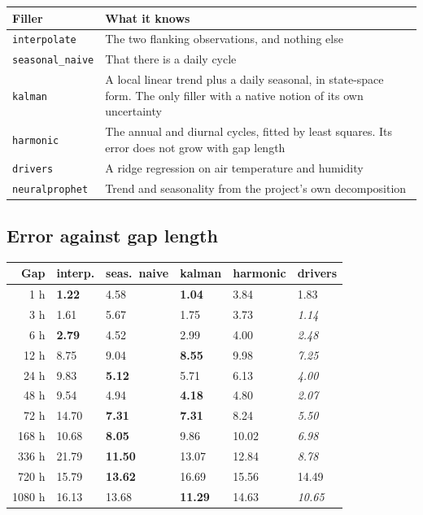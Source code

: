\documentclass[11pt,a4paper]{article}
\begin{document}
\begin{center}
\small
\begin{tabularx}{\textwidth}{L{3.0cm}Y}
\toprule
\textbf{Filler} & \textbf{What it knows} \\
\midrule
\texttt{interpolate}    & The two flanking observations, and nothing else \\
\texttt{seasonal\_naive} & That there is a daily cycle \\
\texttt{kalman}          & A local linear trend plus a daily seasonal, in state-space form. The only filler with a native notion of its own uncertainty \\
\texttt{harmonic}        & The annual and diurnal cycles, fitted by least squares. Its error does not grow with gap length \\
\texttt{drivers}         & A ridge regression on air temperature and humidity \\
\texttt{neuralprophet}   & Trend and seasonality from the project's own decomposition \\
\bottomrule
\end{tabularx}
\end{center}

\subsection{Error against gap length}

\begin{center}
\small
\begin{tabular}{rR{1.6cm}R{1.8cm}R{1.4cm}R{1.8cm}R{1.4cm}}
\toprule
\textbf{Gap} & \textbf{interp.} & \textbf{seas.\ naive} &
\textbf{kalman} & \textbf{harmonic} & \textbf{drivers} \\
 h     & \textbf{1.22} &  4.58 &  \textbf{1.04} &  3.84 &  1.83 \\
3 h     &  1.61 &  5.67 &  1.75 &  3.73 & \textit{1.14} \\
6 h     &  \textbf{2.79} &  4.52 &  2.99 &  4.00 & \textit{2.48} \\
12 h    &  8.75 &  9.04 &  \textbf{8.55} &  9.98 & \textit{7.25} \\
24 h    &  9.83 &  \textbf{5.12} &  5.71 &  6.13 & \textit{4.00} \\
48 h    &  9.54 &  4.94 &  \textbf{4.18} &  4.80 & \textit{2.07} \\
72 h    & 14.70 &  \textbf{7.31} &  \textbf{7.31} &  8.24 & \textit{5.50} \\
168 h   & 10.68 &  \textbf{8.05} &  9.86 & 10.02 & \textit{6.98} \\
336 h   & 21.79 & \textbf{11.50} & 13.07 & 12.84 & \textit{8.78} \\
720 h   & 15.79 & \textbf{13.62} & 16.69 & 15.56 & 14.49 \\
1080 h  & 16.13 & 13.68 & \textbf{11.29} & 14.63 & \textit{10.65} \\
\bottomrule
\end{tabular}
\end{center}
\end{document}
